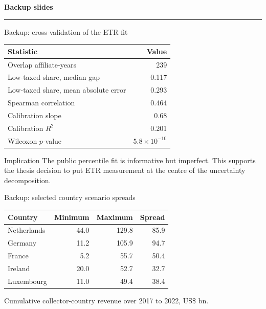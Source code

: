 \documentclass[aspectratio=169, 11pt]{beamer}
\begin{document}
\appendix

{
\begin{frame}[plain]
  \vfill
  \centering
  {\color{Ivory}\LARGE\bfseries Backup slides}\\[0.6em]
  {\color{DkOrange}\rule{4cm}{2pt}}
  \vfill
\end{frame}
}

\begin{frame}{Backup: cross-validation of the ETR fit}
\begin{center}
\small
\begin{tabular}{@{}lr@{}}
  \toprule
  Statistic & Value \\
  \midrule
  Overlap affiliate-years & 239 \\
  Low-taxed share, median gap & 0.117 \\
  Low-taxed share, mean absolute error & 0.293 \\
  Spearman correlation & 0.464 \\
  Calibration slope & 0.68 \\
  Calibration $R^2$ & 0.201 \\
  Wilcoxon $p$-value & $5.8\times10^{-10}$ \\
  \bottomrule
\end{tabular}
\end{center}

\vspace{0.6em}
\begin{alertblock}{Implication}
  The public percentile fit is informative but imperfect. This supports the thesis decision to put ETR measurement at the centre of the uncertainty decomposition.
\end{alertblock}
\end{frame}

\begin{frame}{Backup: selected country scenario spreads}
\begin{center}
\small
\begin{tabular}{@{}lrrr@{}}
  \toprule
  Country & Minimum & Maximum & Spread \\
  \midrule
  Netherlands & 44.0 & 129.8 & 85.9 \\
  Germany & 11.2 & 105.9 & 94.7 \\
  France & 5.2 & 55.7 & 50.4 \\
  Ireland & 20.0 & 52.7 & 32.7 \\
  Luxembourg & 11.0 & 49.4 & 38.4 \\
  \bottomrule
\end{tabular}
\end{center}

\vspace{0.5em}
\centering
\scriptsize Cumulative collector-country revenue over 2017 to 2022, US\$ bn.
\end{frame}
\end{document}
